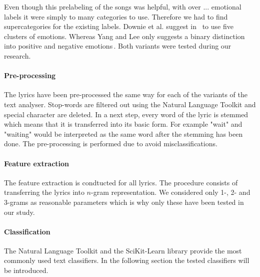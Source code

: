 \documentclass[a4paper,12pt]{article}
\begin{document}
Even though this prelabeling of the songs was helpful, with over ... emotional labels it were simply to many categories to use. Therefore we had to find supercategories for the existing labels. Downie et al. suggest in \,\cite{downie20082007}  to use five clusters of emotions. Whereas Yang and Lee only suggests a binary distinction into positive and negative emotions\,\cite{yang2009music}. Both variants were tested during our research.

\paragraph{Pre-processing} The lyrics have been pre-processed the same way for each of the variants of the text analyser. Stop-words are filtered out using the Natural Language Toolkit and special character are deleted. In a next step, every word of the lyric is stemmed which means that it is transferred into its basic form. For example "wait" and "waiting" would be interpreted as the same word after the stemming has been done. The pre-processing is performed due to avoid misclassifications. 

\paragraph{Feature extraction} The feature extraction is condtucted for all lyrics. The procedure consists of transferring the lyrics into $n$-gram representation. We considered only 1-, 2- and 3-grams as reasonable parameters which is why only these have been tested in our study. 

\paragraph{Classification} The Natural Language Toolkit and the SciKit-Learn library provide the most commonly used text classifiers. In the following section the tested classifiers will be introduced. 
\end{document}
